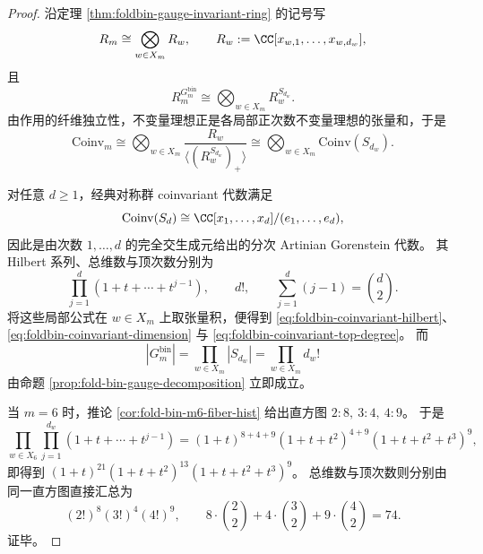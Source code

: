 \begin{proof}
沿定理 \ref{thm:foldbin-gauge-invariant-ring} 的记号写
\[
R_m\cong \bigotimes_{w\in X_m}R_w,
\qquad
R_w:=\CC[x_{w,1},\dots,x_{w,d_w}],
\]
且
\[
R_m^{G_m^{\mathrm{bin}}}
\cong
\bigotimes_{w\in X_m}R_w^{S_{d_w}}.
\]
由作用的纤维独立性，不变量理想正是各局部正次数不变量理想的张量和，于是
\[
\mathrm{Coinv}_m
\cong
\bigotimes_{w\in X_m}
\frac{R_w}{\langle (R_w^{S_{d_w}})_+\rangle}
\cong
\bigotimes_{w\in X_m}\mathrm{Coinv}(S_{d_w}).
\]

对任意 \(d\ge 1\)，经典对称群 coinvariant 代数满足
\[
\mathrm{Coinv}(S_d)
\cong
\CC[x_1,\dots,x_d]/(e_1,\dots,e_d),
\]
因此是由次数 \(1,\dots,d\) 的完全交生成元给出的分次 Artinian Gorenstein 代数。
其 Hilbert 系列、总维数与顶次数分别为
\[
\prod_{j=1}^{d}(1+t+\cdots+t^{j-1}),
\qquad
d!,
\qquad
\sum_{j=1}^{d}(j-1)=\binom{d}{2}.
\]
将这些局部公式在 \(w\in X_m\) 上取张量积，便得到 \eqref{eq:foldbin-coinvariant-hilbert}、\eqref{eq:foldbin-coinvariant-dimension} 与 \eqref{eq:foldbin-coinvariant-top-degree}。
而
\[
|G_m^{\mathrm{bin}}|
=
\prod_{w\in X_m}|S_{d_w}|
=
\prod_{w\in X_m}d_w!
\]
由命题 \ref{prop:fold-bin-gauge-decomposition} 立即成立。

当 \(m=6\) 时，推论 \ref{cor:fold-bin-m6-fiber-hist} 给出直方图 \(2:8,\ 3:4,\ 4:9\)。
于是
\[
\prod_{w\in X_6}\prod_{j=1}^{d_w}(1+t+\cdots+t^{j-1})
=(1+t)^{8+4+9}(1+t+t^2)^{4+9}(1+t+t^2+t^3)^9,
\]
即得到 \((1+t)^{21}(1+t+t^2)^{13}(1+t+t^2+t^3)^9\)。
总维数与顶次数则分别由同一直方图直接汇总为
\[
(2!)^8(3!)^4(4!)^9,
\qquad
8\cdot \binom22+4\cdot \binom32+9\cdot \binom42=74.
\]
证毕。
\end{proof}

\endinput
